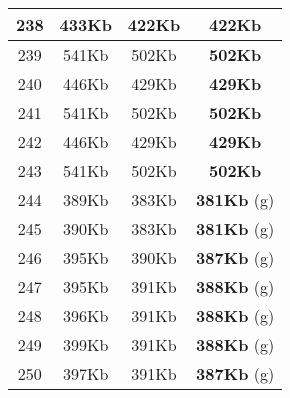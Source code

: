 \begin{table}[H]
\begin{minipage}{5cm}
{\begin{tabular}{|c|c|c|c|}
\hline
238 & 433Kb & 422Kb & \textbf{422Kb} \\
\hline
239 & 541Kb & 502Kb & \textbf{502Kb} \\
\hline
240 & 446Kb & 429Kb & \textbf{429Kb} \\
\hline
241 & 541Kb & 502Kb & \textbf{502Kb} \\
\hline
242 & 446Kb & 429Kb & \textbf{429Kb} \\
\hline
243 & 541Kb & 502Kb & \textbf{502Kb} \\
\hline
244 & 389Kb & 383Kb & \textbf{381Kb} (g) \\
\hline
245 & 390Kb & 383Kb & \textbf{381Kb} (g) \\
\hline
246 & 395Kb & 390Kb & \textbf{387Kb} (g) \\
\hline
247 & 395Kb & 391Kb & \textbf{388Kb} (g) \\
\hline
248 & 396Kb & 391Kb & \textbf{388Kb} (g) \\
\hline
249 & 399Kb & 391Kb & \textbf{388Kb} (g) \\
\hline
250 & 397Kb & 391Kb & \textbf{387Kb} (g) \\
\hline
\end{tabular}
}
\end{minipage}
\end{table}

